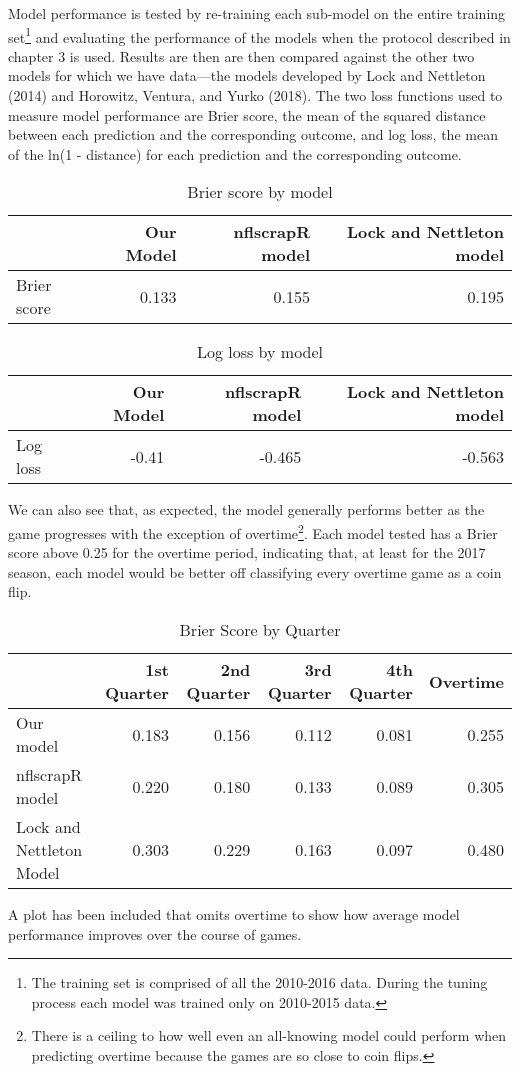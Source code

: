 \documentclass[12pt,twoside]{dukestatscithesis}
\begin{document}
Model performance is tested by re-training each sub-model on the entire training set\footnote{The training set is comprised of all the 2010-2016 data. During the tuning process each model was trained only on 2010-2015 data.} and evaluating the performance of the models when the protocol described in chapter 3 is used. Results are then are then compared against the other two models for which we have data---the models developed by Lock and Nettleton (2014) and Horowitz, Ventura, and Yurko (2018). The two loss functions used to measure model performance are Brier score, the mean of the squared distance between each prediction and the corresponding outcome, and log loss, the mean of the ln(1 - distance) for each prediction and the corresponding outcome.
\begin{longtable}[t]{lrrr}
\caption{\label{tab:resultsoverall}Brier score by model}\\
\toprule
  & Our Model & nflscrapR model & Lock and Nettleton model\\
\midrule
Brier score & 0.133 & 0.155 & 0.195\\
\bottomrule
\end{longtable}
\begin{longtable}[t]{lrrr}
\caption{\label{tab:resultsoverall}Log loss by model}\\
\toprule
  & Our Model & nflscrapR model & Lock and Nettleton model\\
\midrule
Log loss & -0.41 & -0.465 & -0.563\\
\bottomrule
\end{longtable}
We can also see that, as expected, the model generally performs better as the game progresses with the exception of overtime\footnote{There is a ceiling to how well even an all-knowing model could perform when predicting overtime because the games are so close to coin flips.}. Each model tested has a Brier score above 0.25 for the overtime period, indicating that, at least for the 2017 season, each model would be better off classifying every overtime game as a coin flip.
\begin{longtable}[t]{lrrrrr}
\caption{\label{tab:resultsquarter}Brier Score by Quarter}\\
\toprule
  & 1st Quarter & 2nd Quarter & 3rd Quarter & 4th Quarter & Overtime\\
\midrule
Our model & 0.183 & 0.156 & 0.112 & 0.081 & 0.255\\
nflscrapR model & 0.220 & 0.180 & 0.133 & 0.089 & 0.305\\
Lock and Nettleton Model & 0.303 & 0.229 & 0.163 & 0.097 & 0.480\\
\bottomrule
\end{longtable}
A plot has been included that omits overtime to show how average model performance improves over the course of games.
\end{document}
